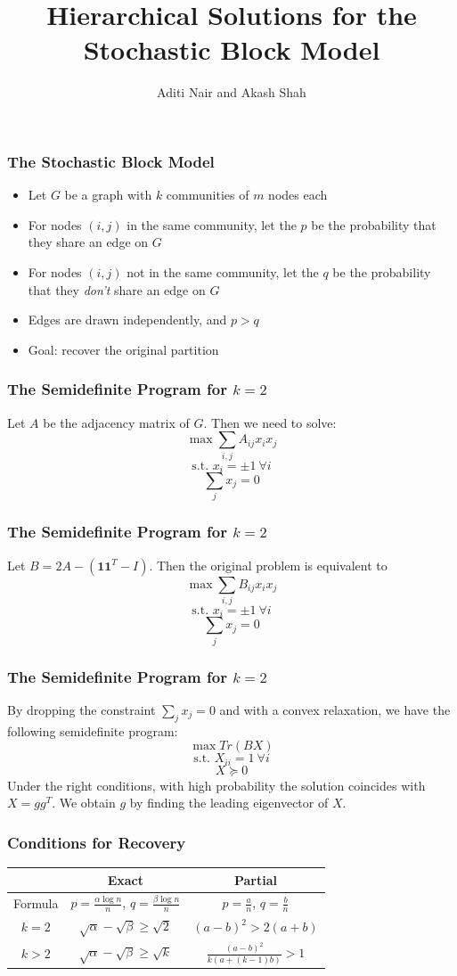\documentclass[10pt]{beamer}
\title{Hierarchical Solutions for the Stochastic Block Model}
\author{Aditi Nair and Akash Shah}
\begin{document}
\maketitle

\begin{frame}
\frametitle{The Stochastic Block Model}
\begin{itemize}
\item{Let $G$ be a graph with $k$ communities of $m$ nodes each}
\item{For nodes $(i,j)$ in the same community, let the $p$ be the probability that they share an edge on $G$}
\item{For nodes $(i,j)$ not in the same community, let the $q$ be the probability that they \textit{don't} share an edge on $G$}
\item{Edges are drawn independently, and $p>q$}
\item{Goal: recover the original partition}
\end{itemize}
\end{frame}

\begin{frame}
\frametitle{The Semidefinite Program for $k=2$}
Let $A$ be the adjacency matrix of $G$. Then we need to solve:
$$\max \sum_{i,j} A_{ij} x_{i} x_{j} $$
$$ \text{s.t. } x_i = \pm 1 \ \forall i$$
$$\sum_j x_j = 0$$
\end{frame}

\begin{frame}
\frametitle{The Semidefinite Program for $k=2$}
Let $B = 2A - (\textbf{1}\textbf{1}^T - I)$. Then the original problem is equivalent to
$$\max \sum_{i,j} B_{ij} x_{i} x_{j} $$
$$ \text{s.t. } x_i = \pm 1 \ \forall i$$
$$\sum_j x_j = 0$$
\end{frame}

\begin{frame}
\frametitle{The Semidefinite Program for $k=2$}
By dropping the constraint $\sum_j x_j = 0$ and with a convex relaxation, we have the following semidefinite program:
$$\max Tr(BX)$$
$$ \text{s.t. } X_{ii}= 1 \ \forall i$$
$$X \succeq 0$$
Under the right conditions, with high probability the solution coincides with $X=gg^{T}$. We obtain $g$ by finding the leading eigenvector of $X$.
\end{frame}

\begin{frame}
\frametitle{Conditions for Recovery}
\begin{tabular}{c | c | c }
 & Exact & Partial \\ \hline
 Formula & $p = \frac{\alpha \log n}{n}$, $q = \frac{\beta \log n}{n}$ & $p = \frac{a}{n}$, $q = \frac{b}{n}$ \\ \hline
$k = 2$ & $\sqrt{\alpha} - \sqrt{\beta} \geq \sqrt{2}$ & $(a-b)^2 > 2(a+b)$ \\ 
$k > 2$ &  $\sqrt{\alpha} - \sqrt{\beta} \geq \sqrt{k}$ & $\frac{(a-b)^2}{k(a+(k-1)b)} > 1$ \\ \hline
 \end{tabular}
\end{frame}
\end{document}
